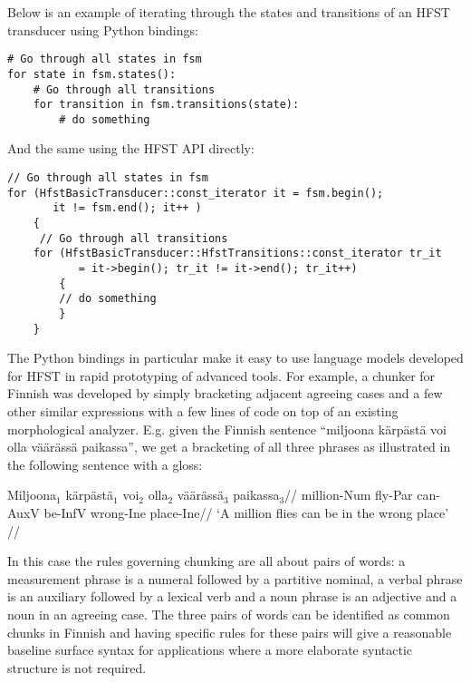 \documentclass{llncs}
\begin{document}
Below is an example of iterating through the states and transitions of
an HFST transducer using Python bindings:

\begin{verbatim}
# Go through all states in fsm       
for state in fsm.states():
    # Go through all transitions                                               
    for transition in fsm.transitions(state):
        # do something
\end{verbatim}

And the same using the HFST API directly:

\begin{verbatim}
// Go through all states in fsm
for (HfstBasicTransducer::const_iterator it = fsm.begin();
       it != fsm.end(); it++ )      
    {      
     // Go through all transitions    
    for (HfstBasicTransducer::HfstTransitions::const_iterator tr_it  
           = it->begin(); tr_it != it->end(); tr_it++) 
        {
        // do something
        }
    }
\end{verbatim}

The Python bindings in particular make it easy to use language models
developed for HFST in rapid prototyping of advanced tools. For example, a
chunker for Finnish was developed by simply bracketing adjacent
agreeing cases and a few other similar expressions with a few lines of
code on top of an existing morphological analyzer. E.g.  given the Finnish sentence
``miljoona kärpästä voi olla väärässä paikassa'', we get a bracketing of all three
phrases as illustrated in the following sentence with a gloss:

\ex
\begingl[everygla=]
\gla Miljoona$_1$ kärpästä$_1$ voi$_2$ olla$_2$ väärässä$_3$ paikassa$_3$//
\glb million-{\sc Num} fly-{\sc Par} can-{\sc AuxV} be-{\sc InfV} wrong-{\sc Ine} place-{\sc Ine}//
\glft `A million flies can be in the wrong place' //
\endgl
\xe

In this case the rules governing chunking are all about pairs of words: a measurement
phrase is a numeral followed by a partitive nominal, a verbal phrase is an
auxiliary followed by a lexical verb and a noun phrase is an adjective and a noun
in an agreeing case.  The three pairs of words can be identified as common
chunks in Finnish and having specific rules for these pairs
will give a reasonable baseline surface syntax for applications where a more
elaborate syntactic structure is not required.
\end{document}
